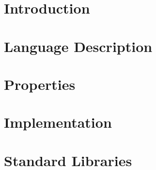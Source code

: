 \documentclass[12pt]{cmuthesis}
\begin{document}
\lstset{language=C++,showstringspaces=false,morekeywords=string}

\newcommand{\langsamplewhere}[5]{
  \begin{figure}[#5]
  
  \end{figure}
}
\newcommand{\langsampleinline}[1]{
  \begin{figure}[here]
  \langtext{#1}
  \end{figure}
}
\newcommand{\langsnippet}[1]{
  
}
\newcommand{\langsample}[4]{\langsamplewhere{#1}{#2}{#3}{#4}{p}}
\newcommand{\footer}[1]{{\bf Footnote:} #1}

\newcommand{\G}{\Gamma}
\newcommand{\entails}{\vdash}
\newcommand{\startdef}[2]{\ensuremath{#1} & ::= & \ensuremath{#2} \\}
\newcommand{\contdef}[1]{ &$\vert$ & \ensuremath{#1} \\}
\newcommand{\OR}{\ensuremath{\ | \ }}

\newcommand{\kw}[1]{{\bf #1}}






\chapter{Introduction}

\chapter{Language Description}

\chapter{Properties}

\chapter{Implementation}

\chapter{Standard Libraries}

\end{document}
